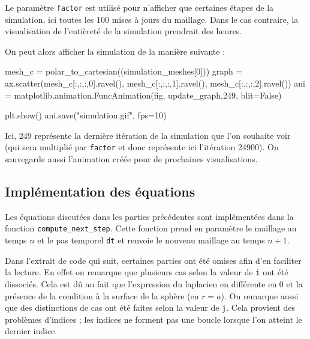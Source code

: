 \documentclass[fleqn]{article}
\begin{document}
Le paramètre \texttt{factor} est utilisé pour n'afficher que certaines étapes de la simulation, ici toutes les 100 mises à jours du maillage. Dans le cas contraire, la visualisation de l'entièreté de la simulation prendrait des heures.

On peut alors afficher la simulation de la manière suivante :
\begin{python}
    mesh_c = polar_to_cartesian((simulation_meshes[0]))
    graph = ax.scatter(mesh_c[:,:,:,0].ravel(), mesh_c[:,:,:,1].ravel(), mesh_c[:,:,:,2].ravel())
    ani = matplotlib.animation.FuncAnimation(fig, update_graph,249, blit=False)

    plt.show()
    ani.save("simulation.gif", fps=10)
\end{python}

Ici, 249 représente la dernière itération de la simulation que l'on souhaite voir (qui sera multiplié par \texttt{factor} et donc représente ici l'itération 24900). On sauvegarde aussi l'animation créée pour de prochaines visualisations.


\subsection{Implémentation des équations}
Les équations discutées dans les parties précédentes sont implémentées dans la fonction \texttt{compute\_next\_step}. Cette fonction prend en paramètre le maillage au temps $n$ et le pas temporel \texttt{dt} et renvoie le nouveau maillage au temps $n+1$.

Dans l'extrait de code qui suit, certaines parties ont été omises afin d'en faciliter la lecture. En effet on remarque que plusieurs cas selon la valeur de \texttt{i} ont été dissociés. Cela est dû au fait que l'expression du laplacien en différente en 0 et la présence de la condition à la surface de la sphère (en $r=a$). On remarque aussi que des distinctions de cas ont été faites selon la valeur de \texttt{j}. Cela provient des problèmes d'indices ; les indices ne forment pas une boucle lorsque l'on atteint le dernier indice.
\end{document}

